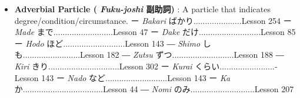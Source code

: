 \begin{itemize}
\item \textbf{Adverbial Particle ( \emph{Fuku-joshi }副助詞) }: A particle that indicates degree\slash condition\slash circumstance. \hfill\break
\hfill\break
ー \emph{Bakari }ばかり\dothyp{}\dothyp{}\dothyp{}\dothyp{}\dothyp{}\dothyp{}\dothyp{}\dothyp{}\dothyp{}\dothyp{}\dothyp{}\dothyp{}\dothyp{}\dothyp{}\dothyp{}\dothyp{}\dothyp{}\dothyp{}\dothyp{}\dothyp{}\dothyp{}Lesson 254 \hfill\break
ー \emph{Made }まで\dothyp{}\dothyp{}\dothyp{}\dothyp{}\dothyp{}\dothyp{}\dothyp{}\dothyp{}\dothyp{}\dothyp{}\dothyp{}\dothyp{}\dothyp{}\dothyp{}\dothyp{}\dothyp{}\dothyp{}\dothyp{}\dothyp{}\dothyp{}\dothyp{}\dothyp{}\dothyp{}\dothyp{}..Lesson 47 \hfill\break
ー \emph{Dake }だけ\dothyp{}\dothyp{}\dothyp{}\dothyp{}\dothyp{}\dothyp{}\dothyp{}\dothyp{}\dothyp{}\dothyp{}\dothyp{}\dothyp{}\dothyp{}\dothyp{}\dothyp{}\dothyp{}\dothyp{}\dothyp{}\dothyp{}\dothyp{}\dothyp{}\dothyp{}\dothyp{}\dothyp{}\dothyp{}\dothyp{}\dothyp{}Lesson 85 \hfill\break
ー \emph{Hodo }ほど\dothyp{}\dothyp{}\dothyp{}\dothyp{}\dothyp{}\dothyp{}\dothyp{}\dothyp{}\dothyp{}\dothyp{}\dothyp{}\dothyp{}\dothyp{}\dothyp{}\dothyp{}\dothyp{}\dothyp{}\dothyp{}\dothyp{}\dothyp{}\dothyp{}\dothyp{}\dothyp{}\dothyp{}\dothyp{}\dothyp{}\dothyp{}Lesson 143 \hfill\break
― \emph{Shimo }しも\dothyp{}\dothyp{}\dothyp{}\dothyp{}\dothyp{}\dothyp{}\dothyp{}\dothyp{}\dothyp{}\dothyp{}\dothyp{}\dothyp{}\dothyp{}\dothyp{}\dothyp{}\dothyp{}\dothyp{}\dothyp{}\dothyp{}\dothyp{}\dothyp{}\dothyp{}\dothyp{}\dothyp{}.Lesson 182 \hfill\break
― \emph{Zutsu }ずつ\dothyp{}\dothyp{}\dothyp{}\dothyp{}\dothyp{}\dothyp{}\dothyp{}\dothyp{}\dothyp{}\dothyp{}\dothyp{}\dothyp{}\dothyp{}\dothyp{}\dothyp{}\dothyp{}\dothyp{}\dothyp{}\dothyp{}\dothyp{}\dothyp{}\dothyp{}\dothyp{}\dothyp{}\dothyp{}\dothyp{}\dothyp{}Lesson 188 \hfill\break
― \emph{Kiri }きり\dothyp{}\dothyp{}\dothyp{}\dothyp{}\dothyp{}\dothyp{}\dothyp{}\dothyp{}\dothyp{}\dothyp{}\dothyp{}\dothyp{}\dothyp{}\dothyp{}\dothyp{}\dothyp{}\dothyp{}\dothyp{}\dothyp{}\dothyp{}\dothyp{}\dothyp{}\dothyp{}\dothyp{}\dothyp{}\dothyp{}\dothyp{}\dothyp{}\dothyp{}\dothyp{}.Lesson 302 \hfill\break
ー \emph{Kurai }くらい\dothyp{}\dothyp{}\dothyp{}\dothyp{}\dothyp{}\dothyp{}\dothyp{}\dothyp{}\dothyp{}\dothyp{}\dothyp{}\dothyp{}\dothyp{}\dothyp{}\dothyp{}\dothyp{}\dothyp{}\dothyp{}\dothyp{}\dothyp{}\dothyp{}\dothyp{}\dothyp{}\dothyp{}Lesson 143 \hfill\break
ー \emph{Nado }など\dothyp{}\dothyp{}\dothyp{}\dothyp{}\dothyp{}\dothyp{}\dothyp{}\dothyp{}\dothyp{}\dothyp{}\dothyp{}\dothyp{}\dothyp{}\dothyp{}\dothyp{}\dothyp{}\dothyp{}\dothyp{}\dothyp{}\dothyp{}\dothyp{}\dothyp{}\dothyp{}\dothyp{}\dothyp{}\dothyp{}\dothyp{}Lesson 143 \hfill\break
ー \emph{Ka }か\dothyp{}\dothyp{}\dothyp{}\dothyp{}\dothyp{}\dothyp{}\dothyp{}\dothyp{}\dothyp{}\dothyp{}\dothyp{}\dothyp{}\dothyp{}\dothyp{}\dothyp{}\dothyp{}\dothyp{}\dothyp{}\dothyp{}\dothyp{}\dothyp{}\dothyp{}\dothyp{}\dothyp{}\dothyp{}\dothyp{}\dothyp{}\dothyp{}\dothyp{}\dothyp{}\dothyp{}\dothyp{}\dothyp{}..Lesson 44 \hfill\break
― \emph{Nomi }のみ\dothyp{}\dothyp{}\dothyp{}\dothyp{}\dothyp{}\dothyp{}\dothyp{}\dothyp{}\dothyp{}\dothyp{}\dothyp{}\dothyp{}\dothyp{}\dothyp{}\dothyp{}\dothyp{}\dothyp{}\dothyp{}\dothyp{}\dothyp{}\dothyp{}\dothyp{}\dothyp{}\dothyp{}\dothyp{}\dothyp{}\dothyp{}.Lesson 207 \hfill\break
\hfill\break


\end{itemize}
